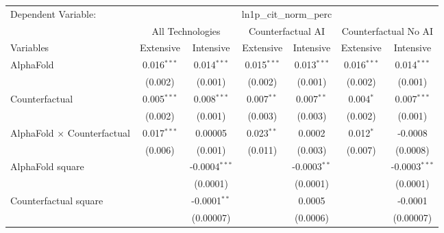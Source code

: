 \begingroup
\centering
\begin{tabular}{lcccccc}
   \tabularnewline \midrule \midrule
   Dependent Variable: & \multicolumn{6}{c}{ln1p\_cit\_norm\_perc}\\
 & \multicolumn{2}{c}{All Technologies} & \multicolumn{2}{c}{Counterfactual AI} & \multicolumn{2}{c}{Counterfactual No AI} \\
\cmidrule(lr){1-1}\cmidrule(lr){2-3} \cmidrule(lr){4-5} \cmidrule(lr){6-7}
Variables & \multicolumn{1}{c}{Extensive} & \multicolumn{1}{c}{Intensive} & \multicolumn{1}{c}{Extensive} & \multicolumn{1}{c}{Intensive} & \multicolumn{1}{c}{Extensive} & \multicolumn{1}{c}{Intensive} \\
\cmidrule(lr){1-1}\cmidrule(lr){2-2} \cmidrule(lr){3-3} \cmidrule(lr){4-4} \cmidrule(lr){5-5} \cmidrule(lr){6-6} \cmidrule(lr){7-7}
   AlphaFold                          & 0.016$^{***}$ & 0.014$^{***}$   & 0.015$^{***}$ & 0.013$^{***}$  & 0.016$^{***}$ & 0.014$^{***}$\\   
                                      & (0.002)       & (0.001)         & (0.002)       & (0.001)        & (0.002)       & (0.001)\\   
   Counterfactual                     & 0.005$^{***}$ & 0.008$^{***}$   & 0.007$^{**}$  & 0.007$^{**}$   & 0.004$^{*}$   & 0.007$^{***}$\\   
                                      & (0.002)       & (0.001)         & (0.003)       & (0.003)        & (0.002)       & (0.001)\\   
   AlphaFold $\times$ Counterfactual  & 0.017$^{***}$ & 0.00005         & 0.023$^{**}$  & 0.0002         & 0.012$^{*}$   & -0.0008\\   
                                      & (0.006)       & (0.001)         & (0.011)       & (0.003)        & (0.007)       & (0.0008)\\   
   AlphaFold square                   &               & -0.0004$^{***}$ &               & -0.0003$^{**}$ &               & -0.0003$^{***}$\\   
                                      &               & (0.0001)        &               & (0.0001)       &               & (0.0001)\\   
   Counterfactual square              &               & -0.0001$^{**}$  &               & 0.0005         &               & -0.0001\\   
                                      &               & (0.00007)       &               & (0.0006)       &               & (0.00007)\\   

\end{tabular}
